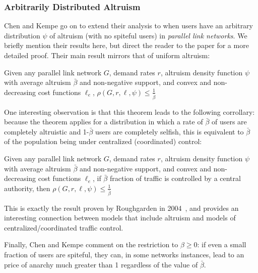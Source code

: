 \subsubsection{Arbitrarily Distributed Altruism}
Chen and Kempe go on to extend their analysis to when users have an arbitrary distribution $\psi$ of altruism (with no spiteful users) in \emph{parallel link networks}. 
We briefly mention their results here, but direct the reader to the paper for a more detailed proof. 
Their main result mirrors that of uniform altruism:
\begin{theorem}
Given any parallel link network $G$, demand rates $r$, altruism density function $\psi$ with average altruism $\bar{\beta}$ and non-negative support, and convex and non-decreasing cost functions $\ell_e$,
   $\rho(G,r,\ell,\psi) \le \frac{1}{\bar{\beta}}$
\end{theorem}
One interesting observation is that this theorem leads to the following corrollary: because the theorem applies for a distribution in which a rate of $\bar{\beta}$ of users are completely altruistic and 1-$\bar{\beta}$ users are completely selfish, this is equivalent to $\bar{\beta}$ of the population being under centralized (coordinated) control:
\begin{corollary}
Given any parallel link network $G$, demand rates $r$, altruism density function $\psi$ with average altruism $\bar{\beta}$ and non-negative support, and convex and non-decreasing cost functions $\ell_e$,
if $\bar{\beta}$ fraction of traffic is controlled by a central authority, then
   $\rho(G,r,\ell,\psi) \le \frac{1}{\bar{\beta}}$
\end{corollary}
This is exactly the result proven by Roughgarden in 2004~\cite{roughgarden04}, and provides an interesting connection between models that include altruism and models of centralized/coordinated traffic control.

Finally, Chen and Kempe comment on the restriction to $\beta \ge 0$: if even a small fraction of users are spiteful, they can, in some networks instances, lead to an price of anarchy much greater than 1 regardless of the value of $\bar{\beta}$.
